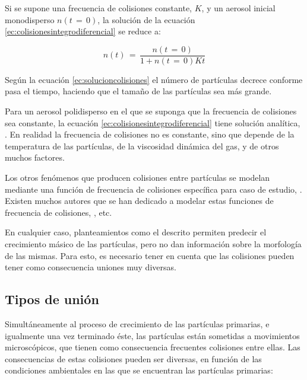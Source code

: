 Si se supone una frecuencia de colisiones constante, $K$, y un aerosol inicial monodisperso $n(t\,=\,0)$, la solución de la ecuación \ref{ec:colisionesintegrodiferencial} se reduce a:

\begin{equation}
\label{ec:solucioncolisiones}
n(t)\,=\, \dfrac{n(t\,=\,0)}{1+n(t\,=\,0)Kt}
\end{equation}

\par Según la ecuación \ref{ec:solucioncolisiones} el número de partículas decrece conforme pasa el tiempo, haciendo que el tamaño de las partículas sea más grande.

\par Para un aerosol polidisperso en el que se suponga que la frecuencia de colisiones sea constante, la ecuación \ref{ec:colisionesintegrodiferencial} tiene solución analítica, \cite{fuchs:1989}. En realidad la frecuencia de colisiones no es constante, sino que depende de la temperatura de las partículas, de la viscosidad dinámica del gas, y de otros muchos factores.

\par Los otros fenómenos que producen colisiones entre partículas se modelan mediante una función de frecuencia de colisiones específica para caso de estudio, \cite{friedlander:2000}. Existen muchos autores que se han dedicado a modelar estas funciones de frecuencia de colisiones, \cite{kazakovetal:1998,kimetal:2001,kostoglouetal:2001}, etc.

\par En cualquier caso, planteamientos como el descrito permiten predecir el crecimiento másico de las partículas, pero no dan información sobre la morfología de las mismas. Para esto, es necesario tener en cuenta que las colisiones pueden tener como consecuencia uniones muy diversas.

\subsection{Tipos de unión}


\par Simultáneamente al proceso de crecimiento de las partículas primarias, e igualmente una vez terminado éste, las partículas están sometidas a movimientos microscópicos, que tienen como consecuencia frecuentes colisiones entre ellas. Las consecuencias de estas colisiones pueden ser diversas, en función de las condiciones ambientales en las que se encuentran las partículas primarias:

